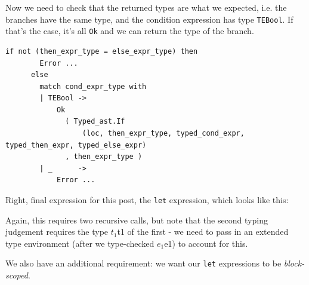 {{Now we need to check that the returned types are what we expected, i.e.
the branches have the same type, and the condition expression has type
\texttt{TEBool}. If that's the case, it's all \texttt{Ok} and we can
return the type of the branch.


\begin{lstlisting}[language=caml]
if not (then_expr_type = else_expr_type) then
        Error ...
      else
        match cond_expr_type with
        | TEBool ->
            Ok
              ( Typed_ast.If
                  (loc, then_expr_type, typed_cond_expr, typed_then_expr, typed_else_expr)
              , then_expr_type )
        | _      ->
            Error ...
\end{lstlisting}

Right, final expression for this post, the \texttt{let} expression,
which looks like this:

{{}}

Again, this requires two recursive calls, but note that the second
typing judgement requires the type
{{{\(t_{1}\)}{{{}{{t}{{{{{{}{{1}}}}{\hspace{0pt}}}{{{}}}}}}}}}} of the
first - we need to pass in an extended type environment (after we
type-checked
{{{\(e_{1}\)}{{{}{{e}{{{{{{}{{1}}}}{\hspace{0pt}}}{{{}}}}}}}}}}) to
account for this.

We also have an additional requirement: we want our \texttt{let}
expressions to be \emph{block-scoped}.

}}
